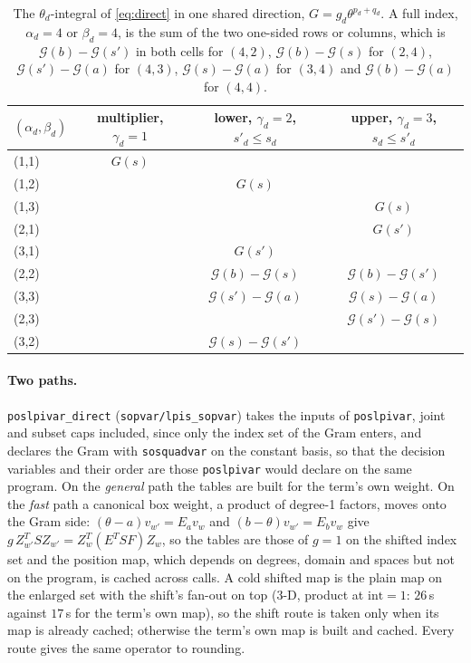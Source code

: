 \documentclass[12pt]{article}
\newcommand{\code}[1]{\texttt{#1}}
\theoremstyle{plain}
\theoremstyle{definition}
\theoremstyle{remark}
\begin{document}
\begin{table}[h]\centering\footnotesize
\begin{tabular}{lccc}
\toprule
$(\alpha_d,\beta_d)$ & multiplier, $\gamma_d=1$ & lower, $\gamma_d=2$, $s'_d\le s_d$ & upper, $\gamma_d=3$, $s_d\le s'_d$ \\
\midrule
(1,1) & $G(s)$ & & \\
(1,2) & & $G(s)$ & \\
(1,3) & & & $G(s)$ \\
(2,1) & & & $G(s')$ \\
(3,1) & & $G(s')$ & \\
(2,2) & & $\mathcal G(b)-\mathcal G(s)$ & $\mathcal G(b)-\mathcal G(s')$ \\
(3,3) & & $\mathcal G(s')-\mathcal G(a)$ & $\mathcal G(s)-\mathcal G(a)$ \\
(2,3) & & & $\mathcal G(s')-\mathcal G(s)$ \\
(3,2) & & $\mathcal G(s)-\mathcal G(s')$ & \\
\bottomrule
\end{tabular}
\caption{The $\theta_d$-integral of \eqref{eq:direct} in one shared direction, $G=g_d\theta^{p_d+q_d}$. A full index, $\alpha_d=4$ or $\beta_d=4$, is the sum of the two one-sided rows or columns, which is $\mathcal G(b)-\mathcal G(s')$ in both cells for $(4,2)$, $\mathcal G(b)-\mathcal G(s)$ for $(2,4)$, $\mathcal G(s')-\mathcal G(a)$ for $(4,3)$, $\mathcal G(s)-\mathcal G(a)$ for $(3,4)$ and $\mathcal G(b)-\mathcal G(a)$ for $(4,4)$.}\label{tab:key}
\end{table}

\paragraph{Two paths.} \code{poslpivar\_direct} (\code{sopvar/lpis\_sopvar}) takes the inputs of \code{poslpivar}, joint and subset caps included, since only the index set of the Gram enters, and declares the Gram with \code{sosquadvar} on the constant basis, so that the decision variables and their order are those \code{poslpivar} would declare on the same program. On the \emph{general} path the tables are built for the term's own weight. On the \emph{fast} path a canonical box weight, a product of degree-1 factors, moves onto the Gram side: $(\theta-a)v_{w'}=E_av_w$ and $(b-\theta)v_{w'}=E_bv_w$ give $g\,Z_{w'}^TSZ_{w'}=Z_w^T(E^TSF)Z_w$, so the tables are those of $g=1$ on the shifted index set and the position map, which depends on degrees, domain and spaces but not on the program, is cached across calls. A cold shifted map is the plain map on the enlarged set with the shift's fan-out on top (3-D, product at $\mathrm{int}=1$: $26$\,s against $17$\,s for the term's own map), so the shift route is taken only when its map is already cached; otherwise the term's own map is built and cached. Every route gives the same operator to rounding.
\end{document}
